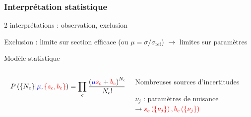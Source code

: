 \begin{frame}
\frametitle{Interpr\'etation statistique}

\begin{small}
\begin{maliste}
\item 2 interprétations : observation, exclusion
\vspace*{0.1cm}
\item Exclusion : limite sur section efficace (ou $\mu=\sigma/\sigma_\text{ref}$) $\rightarrow$ limites sur paramètres
\end{maliste}

\begin{center}
\end{center}
\end{small}

\vspace*{-0.1cm}
\pause
\begin{varblock}[1.05\textwidth]{Modèle statistique}

\vspace*{-0.2cm}
\begin{columns}
\begin{column}{0.5\textwidth}
\begin{footnotesize}
\[
\hspace*{0.3cm}
P\left(\{N_{c}\}|\textcolor{blue}{\mu},\textcolor{red}{\{s_c,b_{c}\}}\right)=\prod\limits_c\frac{\left(\textcolor{blue}{\mu} \textcolor{red}{s_c}+\textcolor{red}{b_{c}}\right)^{N_{c}}}{N_{c}!}e^{-\left(\textcolor{blue}{\mu} \textcolor{red}{s_c}+\textcolor{red}{b_{c}}\right)}
\]
\end{footnotesize}
\end{column}

\begin{column}{0.5\textwidth}
\begin{maliste}
\item Nombreuses sources d'incertitudes
\vspace*{0.2cm}
\item $\nu_j$ : paramètres de nuisance 
$\rightarrow \textcolor{red}{s_c\left(\{\nu_j\}\right), b_{c}\left(\{\nu_j\}\right)}$
\end{maliste}
\end{column}
\end{columns}
\end{varblock}


\end{frame}

